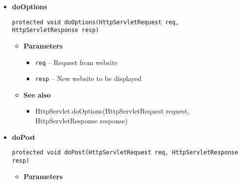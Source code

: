 \documentclass[11pt,a4paper]{report}
\begin{document}
{{{{{{{{{{{{{{{\begin{itemize}
{\begin{itemize}
{								}%
								\item{{\bf  See also}
									\begin{itemize}
										\item{ HttpServlet.doHead(HttpServletRequest request, HttpServletResponse response)}
									\end{itemize}
								}%
							\end{itemize}
						}%
						\item{ 
								\hypertarget{studyplanning.view.ViewBuilder.doOptions(HttpServletRequest, HttpServletResponse)}{{\bf  doOptions}\\}
								\begin{lstlisting}[frame=none]
protected void doOptions(HttpServletRequest req, HttpServletResponse resp)
								\end{lstlisting} %
								\begin{itemize}
									\item{
										{\bf  Parameters}
										\begin{itemize}
											\item{\texttt{req} -- Request from website}
											\item{\texttt{resp} -- New website to be displayed}
										\end{itemize}
									}%
									\item{{\bf  See also}
										\begin{itemize}
											\item{ HttpServlet.doOptions(HttpServletRequest request, HttpServletResponse response)}
										\end{itemize}
									}%
								\end{itemize}
							}%
							\item{ 
								\hypertarget{studyplanning.view.ViewBuilder.doPost(HttpServletRequest, HttpServletResponse)}{{\bf  doPost}\\}
								\begin{lstlisting}[frame=none]
protected void doPost(HttpServletRequest req, HttpServletResponse resp)
								\end{lstlisting} %
								\begin{itemize}
									\item{
										{\bf  Parameters}
										\begin{itemize}

\end{itemize}}
\end{itemize}}
\end{itemize}}}}}}}}}}}}}}}}
\end{document}

